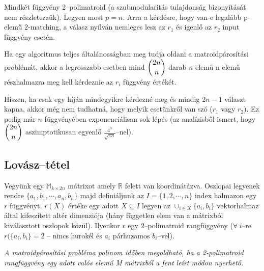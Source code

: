 Mindkét függvény $2$--polimatroid (a szubmodularitás tulajdonság bizonyítását
nem részletezzük). Legyen most $p=n$. Arra a kérdésre, hogy van-e legalább
p-elemű $2$-matching, a válasz nyílván nemleges lesz az $r_1$ és igenlő az $r_2$
input függvény esetén. 

Ha egy algoritmus teljes általánosságban meg tudja oldani a matroidpárosítási
problémát, akkor a legrosszabb esetben mind $\dbinom{2n}{n}$ darab $n$ elemű n
elemű részhalmazra meg kell kérdeznie az $r_i$ függvény értékét.

Hiszen, ha csak egy híján mindegyikre kérdezné meg és mindig $2n-1$ választ
kapna, akkor még nem tudhatná, hogy melyik esetünkről van szó ($r_1$ vagy
$r_2$). Ez pedig már $n$ függvényében exponenciálisan sok lépés (az analízisből
ismert, hogy $\dbinom{2n}{n}$ aszimptotikusan egyenlő $\frac{4^n}{\sqrt{\pi
n}}$--nel).

\subsection{Lovász--tétel}

Vegyünk egy $\mathbb{M}_{k \times 2n}$ mátrixot amely $\mathbb{R}$ felett van
koordinátázva. Oszlopai legyenek rendre $\{a_1, b_1, \cdots, a_n, b_n \}$ majd
definiáljunk az $I=\{1,2,\cdots,n\}$ index halmazon egy $r$ függvényt. $r(X)$
értéke egy adott $X\subseteq I$ legyen az $\cup_{i \in X}\{a_i, b_i\}$
vektorhalmaz által kifeszített altér dimenziója (hány független elem van a
mátrixból kiválasztott oszlopok közül). Ilyenkor $r$ egy $2$--polimatroid
rangfüggvény ($\forall~i$--re $r(\{a_i, b_i\}=2$ -- nincs hurokél és $a_i$
párhuzamos $b_i$--vel).

\vspace{0.4cm}
\emph{
A matroidpárosítási probléma polinom időben megoldható, ha a 2-polimatroid
rangfüggvény egy adott valós elemű M mátrixból a fent leírt módon nyerhető.}
